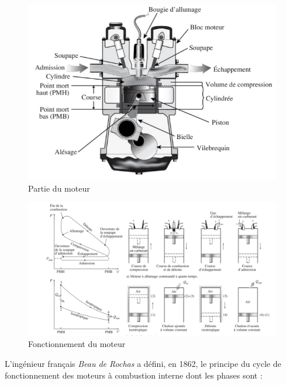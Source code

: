 \begin{figure}[h]
	\centering
	\includegraphics[width=0.7\linewidth]{"Img/partie du moteur"}
	\caption[Partie du moteur]{Partie du moteur}
	\label{fig:partie-du-moteur}
\end{figure}
\begin{figure}[h]
	\centering
	\includegraphics[width=0.7\linewidth]{"Img/cycle theorique"}
	\caption[fonctionnement du moteur]{Fonctionnement du moteur}
	\label{fig:cycle-theorique}
\end{figure}


L'ingénieur français \emph{Beau de Rochas} a défini, en 1862, le principe du cycle de fonctionnement des moteurs à combustion interne dont les phases
sont :

